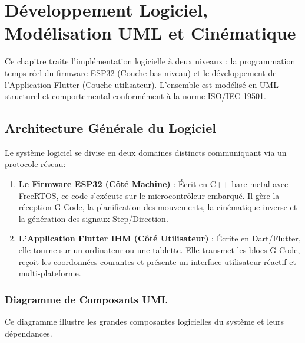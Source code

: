 \chapter{Développement Logiciel, Modélisation UML et Cinématique}
\label{chap:logiciel}

Ce chapitre traite l'implémentation logicielle à deux niveaux : la programmation temps réel du firmware ESP32 (Couche bas-niveau) et le développement de l'Application Flutter (Couche utilisateur). L'ensemble est modélisé en UML structurel et comportemental conformément à la norme ISO/IEC 19501.

\section{Architecture Générale du Logiciel}

Le système logiciel se divise en deux domaines distincts communiquant via un protocole réseau:

\begin{enumerate}
    \item \textbf{Le Firmware ESP32 (Côté Machine)} : Écrit en C++ bare-metal avec FreeRTOS, ce code s'exécute sur le microcontrôleur embarqué. Il gère la réception G-Code, la planification des mouvements, la cinématique inverse et la génération des signaux Step/Direction.
    \item \textbf{L'Application Flutter IHM (Côté Utilisateur)} : Écrite en Dart/Flutter, elle tourne sur un ordinateur ou une tablette. Elle transmet les blocs G-Code, reçoit les coordonnées courantes et présente un interface utilisateur réactif et multi-plateforme.
\end{enumerate}
 
\subsection{Diagramme de Composants UML}
Ce diagramme illustre les grandes composantes logicielles du système et leurs dépendances.

